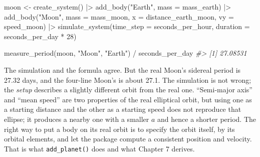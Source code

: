 \documentclass[
  10.5pt,
  letterpaper,
]{scrbook}
\newenvironment{Shaded}{\begin{snugshade}}{\end{snugshade}}
\newcommand{\AttributeTok}[1]{\textcolor[rgb]{0.00,0.00,0.00}{#1}}
\newcommand{\CommentTok}[1]{\textcolor[rgb]{0.00,0.00,0.00}{\textit{#1}}}
\newcommand{\DecValTok}[1]{\textcolor[rgb]{0.00,0.00,0.00}{#1}}
\newcommand{\FunctionTok}[1]{\textcolor[rgb]{0.00,0.00,0.00}{#1}}
\newcommand{\NormalTok}[1]{\textcolor[rgb]{0.00,0.00,0.00}{#1}}
\newcommand{\OtherTok}[1]{\textcolor[rgb]{0.00,0.00,0.00}{#1}}
\newcommand{\SpecialCharTok}[1]{\textcolor[rgb]{0.00,0.00,0.00}{#1}}
\newcommand{\StringTok}[1]{\textcolor[rgb]{0.00,0.00,0.00}{#1}}
\theoremstyle{plain}
\theoremstyle{remark}
\begin{document}
\begin{Shaded}
\begin{Highlighting}[]
\NormalTok{moon }\OtherTok{\textless{}{-}} \FunctionTok{create\_system}\NormalTok{() }\SpecialCharTok{|\textgreater{}}
  \FunctionTok{add\_body}\NormalTok{(}\StringTok{"Earth"}\NormalTok{, }\AttributeTok{mass =}\NormalTok{ mass\_earth) }\SpecialCharTok{|\textgreater{}}
  \FunctionTok{add\_body}\NormalTok{(}\StringTok{"Moon"}\NormalTok{,  }\AttributeTok{mass =}\NormalTok{ mass\_moon, }\AttributeTok{x =}\NormalTok{ distance\_earth\_moon, }\AttributeTok{vy =}\NormalTok{ speed\_moon) }\SpecialCharTok{|\textgreater{}}
  \FunctionTok{simulate\_system}\NormalTok{(}\AttributeTok{time\_step =}\NormalTok{ seconds\_per\_hour, }\AttributeTok{duration =}\NormalTok{ seconds\_per\_day }\SpecialCharTok{*} \DecValTok{28}\NormalTok{)}

\FunctionTok{measure\_period}\NormalTok{(moon, }\StringTok{"Moon"}\NormalTok{, }\StringTok{"Earth"}\NormalTok{) }\SpecialCharTok{/}\NormalTok{ seconds\_per\_day}
\CommentTok{\#\textgreater{} [1] 27.08531}
\end{Highlighting}
\end{Shaded}

The simulation and the formula agree. But the real Moon's sidereal
period is 27.32 days, and the four-line Moon's is about 27.1. The
simulation is not wrong; the \emph{setup} describes a slightly different
orbit from the real one. ``Semi-major axis'' and ``mean speed'' are two
properties of the real elliptical orbit, but using one as a starting
distance and the other as a starting speed does not reproduce that
ellipse; it produces a nearby one with a smaller \(a\) and hence a
shorter period. The right way to put a body on its real orbit is to
specify the orbit itself, by its orbital elements, and let the package
compute a consistent position and velocity. That is what
\texttt{add\_planet()} does and what Chapter 7 derives.
\end{document}
